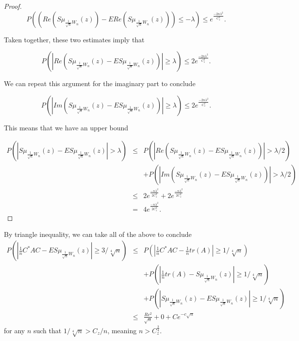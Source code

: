 \documentclass[12pt,a4paper,leqno]{report}
\theoremstyle{plain}
\theoremstyle{definition}
\theoremstyle{remark}
\begin{document}
\begin{proof}
\begin{equation*}
P\left((Re(S\mu_{\frac{1}{\sqrt{n}}W_n}(z))-ERe(S\mu_{\frac{1}{\sqrt{n}}W_n}(z))) \leq  -\lambda \right) \leq
e^{\frac{-2n\lambda^2}{C_z^2}}.
\end{equation*}

Taken together, these two estimates imply that

\begin{equation*}
P\left(|Re(S\mu_{\frac{1}{\sqrt{n}}W_n}(z)-ES\mu_{\frac{1}{\sqrt{n}}W_n}(z))| \geq  \lambda \right)  \leq 2
e^{\frac{-2n\lambda^2}{C_z^2}}.
\end{equation*}

We can repeat this argument for the imaginary part to conclude

\begin{equation*}
P\left(|Im(S\mu_{\frac{1}{\sqrt{n}}W_n}(z)-ES\mu_{\frac{1}{\sqrt{n}}W_n}(z))| \geq  \lambda \right)  \leq 2
e^{\frac{-2n\lambda^2}{C_z^2}}.
\end{equation*}

This means that we have an upper bound

\begin{eqnarray*}
P(|S\mu_{\frac{1}{\sqrt{n}}W_n}(z)- ES\mu_{\frac{1}{\sqrt{n}}W_n}(z)|>\lambda) & \leq &
P(|Re(S\mu_{\frac{1}{\sqrt{n}}W_n}(z)- ES\mu_{\frac{1}{\sqrt{n}}W_n}(z))|>\lambda/2) \\ & &+ 
P(|Im(S\mu_{\frac{1}{\sqrt{n}}W_n}(z)- ES\mu_{\frac{1}{\sqrt{n}}W_n}(z))|>\lambda/2)\\
& \leq & 2
e^{\frac{-n\lambda^2}{2C_z^2}} + 2
e^{\frac{-n\lambda^2}{2C_z^2}}\\
& = & 4
e^{\frac{-n\lambda^2}{2C_z^2}}.
\end{eqnarray*}

\end{proof}

By triangle inequality, we can take all of the above to conclude
\begin{eqnarray*}
P(|\frac{1}{n}C^* A C - ES\mu_{\frac{1}{\sqrt{n}}W_n}(z)| \geq 3 /\sqrt[4]{n}) & \leq &
P(|\frac{1}{n}C^* A C - \frac{1}{n}tr(A)| \geq 1/\sqrt[4]{n})\\
& & + P(|\frac{1}{n}tr(A) - S\mu_{\frac{1}{\sqrt{n}}W_n}(z)| \geq 1/\sqrt[4]{n})\\
& & + P(|S\mu_{\frac{1}{\sqrt{n}}W_n}(z) - ES\mu_{\frac{1}{\sqrt{n}}W_n}(z)| \geq 1/\sqrt[4]{n})\\
& \leq &
\frac{Rc^2}{\sqrt{n}}+0+ Ce^{-c\sqrt{n}}
\end{eqnarray*}
for any $n$ such that $1/\sqrt[4]{n} > C_z/n$, meaning $n>C_z^{\frac{3}{4}}$.
\end{document}
